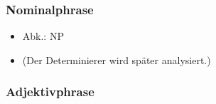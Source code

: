 \begin{frame}
\frametitle{Nominalphrase}

\begin{itemize}
	\item Abk.: NP
	\item (Der Determinierer wird später analysiert.)
\end{itemize}

\begin{figure}[b]

	\begin{minipage}[b]{0.13\textwidth}
	\centering
  	\end{minipage}  
  	\pause            
	\begin{minipage}[b]{0.02\textwidth}
	\hfill
  	\end{minipage}
  	\begin{minipage}[b]{0.30\textwidth}
	\centering
  	\end{minipage}  
	\begin{minipage}[b]{0.02\textwidth}
	\hfill
  	\end{minipage}
  	\pause            
	\begin{minipage}[b]{0.41\textwidth}
	\centering
  	\end{minipage}
\end{figure}
\end{frame}


\subsubsection{Adjektivphrase}

